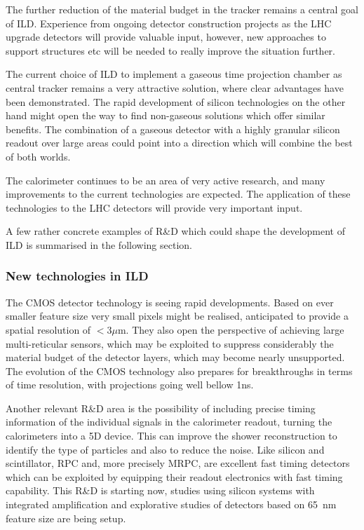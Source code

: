 The further reduction of the material budget in the tracker remains a central goal of ILD. Experience from ongoing detector construction projects as the LHC upgrade detectors will provide valuable input, however, new approaches to support structures etc will be needed to really improve the situation further. 

The current choice of ILD to implement a gaseous time projection chamber as central tracker remains a very attractive solution, where clear advantages have been demonstrated. The rapid development of silicon technologies on the other hand might open the way to find non-gaseous solutions which offer similar benefits. The combination of a gaseous detector with a highly granular silicon readout over large areas could point into a direction which will combine the best of both worlds. 

The calorimeter continues to be an area of very active research, and many improvements to the current technologies are expected. The application of these technologies to the LHC detectors will provide very important input. 


A few rather concrete examples of R\&D which could shape the development of ILD is summarised in the following section. 

\subsubsection{New technologies in ILD}
The CMOS detector technology is seeing rapid developments. Based on ever smaller feature size very small pixels might be realised, anticipated to provide a spatial resolution of $<$3$\mu$m. They also open the perspective of achieving large multi-reticular sensors, which may be exploited to suppress considerably the material budget of the detector layers, which may become nearly unsupported. The evolution of the CMOS technology also prepares for breakthroughs in terms of time resolution, with projections going well bellow 1ns. 

Another relevant R\&D area is the possibility of including precise timing information of the individual signals in the calorimeter readout, turning the calorimeters into a 5D device. This can improve the shower reconstruction to identify the type of particles and also to reduce the noise. Like silicon and scintillator, RPC and, more precisely MRPC, are excellent fast timing detectors which can be exploited by equipping their readout electronics with fast timing capability. This R\&D is starting now, studies using silicon systems with integrated amplification and explorative studies of detectors based on 65~nm feature size are being setup.

